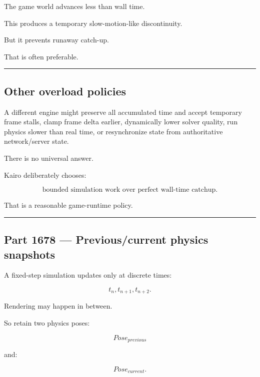 The game world advances less than wall time.

This produces a temporary slow-motion-like discontinuity.

But it prevents runaway catch-up.

That is often preferable.

\begin{center}\rule{0.5\linewidth}{0.5pt}\end{center}

\subsection{Other overload policies}\label{06-engine-ii-ch037-other-overload-policies}

\hypertarget{06-engine-ii-ch037-other-overload-policies}{}

A different engine might preserve all accumulated time and accept temporary frame stalls, clamp frame delta earlier, dynamically lower solver quality, run physics slower than real time, or resynchronize state from authoritative network/server state.

There is no universal answer.

Kairo deliberately chooses:

\[
\boxed{
\text{bounded simulation work over perfect wall-time catchup}.
}
\]

That is a reasonable game-runtime policy.

\begin{center}\rule{0.5\linewidth}{0.5pt}\end{center}

\subsection{Part 1678 --- Previous/current physics snapshots}\label{06-engine-ii-ch037-part-1678-previouscurrent-physics-snapshots}

\hypertarget{06-engine-ii-ch037-part-1678-previouscurrent-physics-snapshots}{}

A fixed-step simulation updates only at discrete times:

\[
t_n,
t_{n+1},
t_{n+2}.
\]

Rendering may happen in between.

So retain two physics poses:

\[
Pose_{previous}
\]

and:

\[
Pose_{current}.
\]

